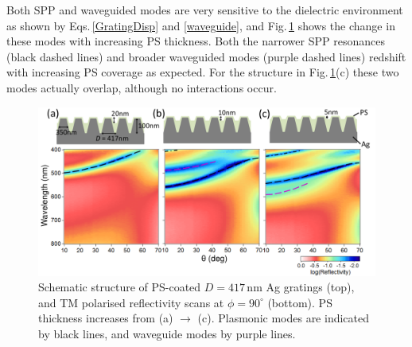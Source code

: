 Both SPP and waveguided modes are very sensitive to the dielectric environment as shown by Eqs.\,\ref{GratingDisp} and \ref{waveguide}, and Fig.\,\ref{7Fig13} shows the change in these modes with increasing PS thickness. Both the narrower SPP resonances (black dashed lines) and broader waveguided modes (purple dashed lines) redshift with increasing PS coverage as expected. For the structure in Fig.\,\ref{7Fig13}(c) these two modes actually overlap, although no interactions occur.
\begin{figure}[h!] 
\centering    
\includegraphics[width=\textwidth]{Fig13}
\caption{Schematic structure of PS-coated $D=417$\,nm Ag gratings (top), and TM polarised reflectivity scans at $\phi=90^{\circ}$ (bottom). PS thickness increases from (a) $\rightarrow$ (c). Plasmonic modes are indicated by black lines, and waveguide modes by purple lines.}
\label{7Fig13}
\end{figure}

